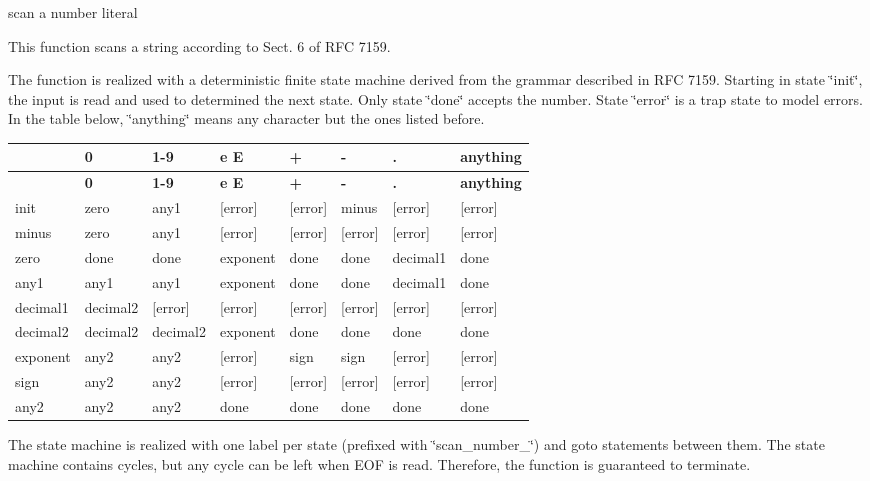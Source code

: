 scan a number literal 

This function scans a string according to Sect. 6 of R\+FC 7159.

The function is realized with a deterministic finite state machine derived from the grammar described in R\+FC 7159. Starting in state \char`\"{}init\char`\"{}, the input is read and used to determined the next state. Only state \char`\"{}done\char`\"{} accepts the number. State \char`\"{}error\char`\"{} is a trap state to model errors. In the table below, \char`\"{}anything\char`\"{} means any character but the ones listed before.

\tabulinesep=1mm
\begin{longtabu} spread 0pt [c]{*8{|X[-1]}|}
\hline
{}&{\bf 0 }&{\bf 1-\/9 }&{\bf e E }&{\bf + }&{\bf -\/ }&{\bf . }&{\bf anything  }\\
\endfirsthead
\hline
\endfoot
\hline
{}&{\bf 0 }&{\bf 1-\/9 }&{\bf e E }&{\bf + }&{\bf -\/ }&{\bf . }&{\bf anything  }\\
\endhead
init &zero &any1 &\mbox{[}error\mbox{]} &\mbox{[}error\mbox{]} &minus &\mbox{[}error\mbox{]} &\mbox{[}error\mbox{]} \\
minus &zero &any1 &\mbox{[}error\mbox{]} &\mbox{[}error\mbox{]} &\mbox{[}error\mbox{]} &\mbox{[}error\mbox{]} &\mbox{[}error\mbox{]} \\
zero &done &done &exponent &done &done &decimal1 &done \\
any1 &any1 &any1 &exponent &done &done &decimal1 &done \\
decimal1 &decimal2 &\mbox{[}error\mbox{]} &\mbox{[}error\mbox{]} &\mbox{[}error\mbox{]} &\mbox{[}error\mbox{]} &\mbox{[}error\mbox{]} &\mbox{[}error\mbox{]} \\
decimal2 &decimal2 &decimal2 &exponent &done &done &done &done \\
exponent &any2 &any2 &\mbox{[}error\mbox{]} &sign &sign &\mbox{[}error\mbox{]} &\mbox{[}error\mbox{]} \\
sign &any2 &any2 &\mbox{[}error\mbox{]} &\mbox{[}error\mbox{]} &\mbox{[}error\mbox{]} &\mbox{[}error\mbox{]} &\mbox{[}error\mbox{]} \\
any2 &any2 &any2 &done &done &done &done &done \\
\end{longtabu}
The state machine is realized with one label per state (prefixed with \char`\"{}scan\+\_\+number\+\_\+\char`\"{}) and {\ttfamily goto} statements between them. The state machine contains cycles, but any cycle can be left when E\+OF is read. Therefore, the function is guaranteed to terminate.

